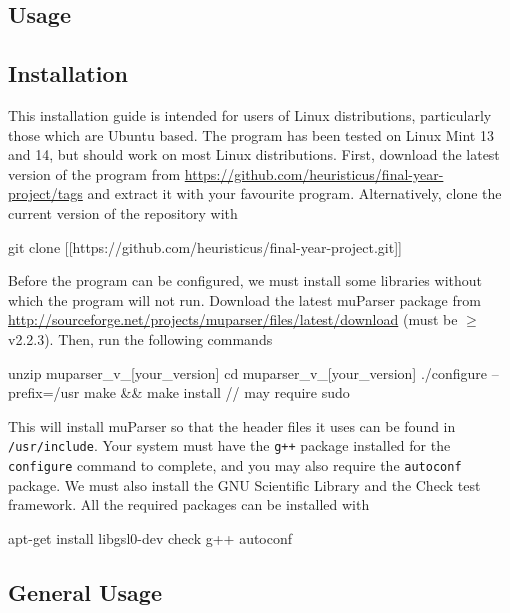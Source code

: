 \documentclass[a4paper,11pt]{article}
\begin{document}
   \newpage
   \printbibliography
   \newpage
\begin{appendices}
\section{Usage}
\label{sec-10}
\subsection{Installation}
\label{sec-10-1}

   This installation guide is intended for users of Linux distributions,
   particularly those which are Ubuntu based. The program has been tested on
   Linux Mint 13 and 14, but should work on most Linux distributions. First,
   download the latest version of the program from
   \href{https://github.com/heuristicus/final-year-project/tags}{https://github.com/heuristicus/final-year-project/tags} and extract it with
   your favourite program. Alternatively, clone the current version of the
   repository with 
   \begin{verbatimtab} 
   git clone [[https://github.com/heuristicus/final-year-project.git]]
   \end{verbatimtab}
   Before the program can be configured, we must install some libraries without
   which the program will not run. Download the latest muParser package from
   \href{http://sourceforge.net/projects/muparser/files/latest/download}{http://sourceforge.net/projects/muparser/files/latest/download} (must be
   $\geq$ v2.2.3). Then, run the following commands
   \begin{verbatimtab}
   unzip muparser_v_[your_version]
   cd muparser_v_[your_version]
   ./configure --prefix=/usr
   make && make install // may require sudo
   \end{verbatimtab}
   This will install muParser so that the header files it uses can be found in
   \texttt{/usr/include}. Your system must have the \texttt{g++} package
   installed for the \texttt{configure} command to complete, and you may also
   require the \texttt{autoconf} package. We must also install the GNU
   Scientific Library and the Check test framework. All the required packages
   can be installed with
   \begin{verbatimtab}
   apt-get install libgsl0-dev check g++ autoconf
   \end{verbatimtab}
\subsection{General Usage}
\label{sec-10-2}


\end{appendices}
\end{document}
